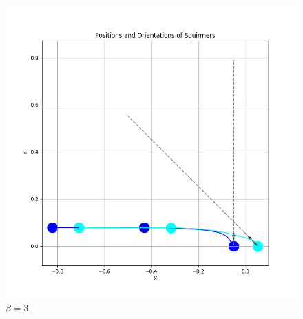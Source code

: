 \documentclass{article}
\begin{document}
\begin{figure}[H]
\begin{minipage}{0.49\textwidth}
        \includegraphics[width=1.1\textwidth]{graphs/simulations/sim_sq_sq/beta3/3pi_4_.png}
        \caption{\footnotesize $\beta = 3$}
    \end{minipage}
\end{figure}
\end{document}
